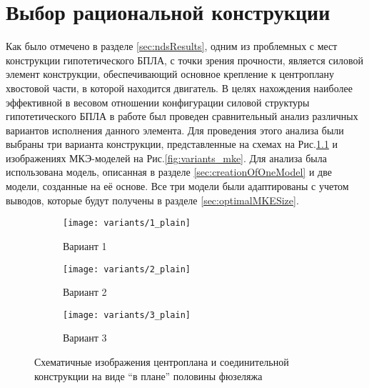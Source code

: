  
\chapter{Выбор рациональной конструкции}
Как было отмечено в разделе \ref{sec:ndsResults}, одним из проблемных с мест конструкции гипотетического БПЛА, с точки зрения прочности, является силовой элемент конструкции, обеспечивающий основное крепление к центроплану хвостовой части, в которой находится двигатель. В целях нахождения наиболее эффективной в весовом отношении конфигурации силовой структуры гипотетического БПЛА в работе был проведен сравнительный анализ различных вариантов исполнения данного элемента. Для проведения этого анализа были выбраны три варианта конструкции, представленные на схемах на Рис.\ref{fig:variants_plain} и изображениях МКЭ-моделей на Рис.\ref{fig:variants_mke}. Для анализа была использована модель, описанная в разделе \ref{sec:creationOfOneModel} и две модели, созданные на её основе. Все три модели были адаптированы с учетом выводов, которые будут получены в разделе \ref{sec:optimalMKESize}.  

\begin{figure}[H]
\centering
\captionsetup{justification=centering}
\begin{subfigure}[b]{0.32\textwidth}
\centering
	\texttt{[image: variants/1\_plain]}
	\caption{Вариант 1}
\end{subfigure}
\hspace{\fill}
\begin{subfigure}[b]{0.32\textwidth}
\centering
	\texttt{[image: variants/2\_plain]}
	\caption{Вариант 2}
\end{subfigure}
\hspace{\fill}
\begin{subfigure}[b]{0.32\textwidth}
\centering
	\texttt{[image: variants/3\_plain]}
	\caption{Вариант 3}
\end{subfigure}
\hspace{\fill}
\caption{Схематичные изображения центроплана и соединительной конструкции на виде ``в плане'' половины фюзеляжа }
\label{fig:variants_plain}
\end{figure}	


